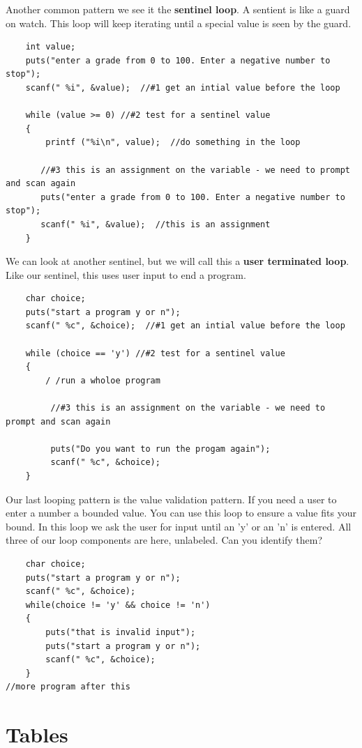 Another common pattern we see it the {\bf sentinel loop}. A sentient is like a guard on watch. This loop will keep iterating until a special value is seen by the guard.  
\begin{verbatim}
 	int value;
 	puts("enter a grade from 0 to 100. Enter a negative number to stop");
 	scanf(" %i", &value);  //#1 get an intial value before the loop
	
 	while (value >= 0) //#2 test for a sentinel value
 	{
	  	printf ("%i\n", value);  //do something in the loop
		
	   //#3 this is an assignment on the variable - we need to prompt and scan again
	   puts("enter a grade from 0 to 100. Enter a negative number to stop");
	   scanf(" %i", &value);  //this is an assignment
 	}
\end{verbatim}
%
We can look at another sentinel, but we will call this a {\bf user terminated loop}. Like our sentinel, this uses user input to end a program.
\begin{verbatim}
	char choice;
	puts("start a program y or n");
	scanf(" %c", &choice);  //#1 get an intial value before the loop
	
	while (choice == 'y') //#2 test for a sentinel value
	{
		/ /run a wholoe program
		
		 //#3 this is an assignment on the variable - we need to prompt and scan again
		
		 puts("Do you want to run the progam again");
		 scanf(" %c", &choice); 
	}
\end{verbatim}
%
Our last looping pattern is the value validation pattern. If you need a user to enter a number a bounded value. You can use this loop to ensure a value fits your bound.  In this loop we ask the user for input until an 'y' or an 'n' is entered. All three of our loop components are here, unlabeled. Can you identify them?
\begin{verbatim}
	char choice;
	puts("start a program y or n");
	scanf(" %c", &choice);  
	while(choice != 'y' && choice != 'n')
	{
		puts("that is invalid input");
		puts("start a program y or n");
		scanf(" %c", &choice);  
	}	
//more program after this
\end{verbatim}
%

\section{Tables}

